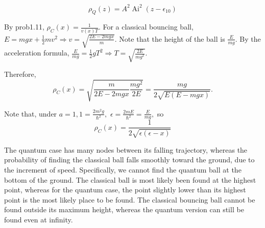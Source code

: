 \begin{enumerate}
    $$
    \rho_Q(z)=A^2\operatorname{Ai}^2(z-\epsilon_{10})
    $$

    By prob1.11, 
    $
    \rho_C(x)=
    \frac{1}{v(x)T}.
    $
    For a classical bouncing ball, $E=mgx+\frac{1}{2}mv^2\Rightarrow v=\sqrt{\frac{2E-2mgx}{m}}.$ Note that 
    the height of the ball is $\frac{E}{mg}.$ By the acceleration formula, $\frac{E}{mg}=\frac{1}{2}gT^2\Rightarrow T=\sqrt{\frac{2E}{mg^2}}.$

    Therefore, 
    $$
    \rho_C(x)=\sqrt{\frac{m}{2E-2mgx}\frac{mg^2}{2E}}=
    \frac{mg}{2\sqrt{E(E-mgx)}}.
    $$

    Note that, under $a=1, 1=\frac{2m^2g}{\hbar^2},$ $\epsilon=\frac{2mE}{\hbar^2}=\frac{E}{mg},$ so 
    $$
    \rho_C(x)=\frac{1}{2\sqrt{\epsilon(\epsilon-x)}}
    $$

    The quantum case has many nodes between its falling trajectory, whereas the probability of finding the classical ball falls smoothly toward the ground, due to the increment of speed. Specifically, we cannot find the quantum ball at the bottom of the ground.
    The classical ball is most likely been found at the highest point, whereas for the quantum case, the point slightly lower than its highest point is the most likely place to be found.
    The classical bouncing ball cannot be found outside its maximum height, whereas the quantum version can still be found even at infinity.
    

\end{enumerate}
